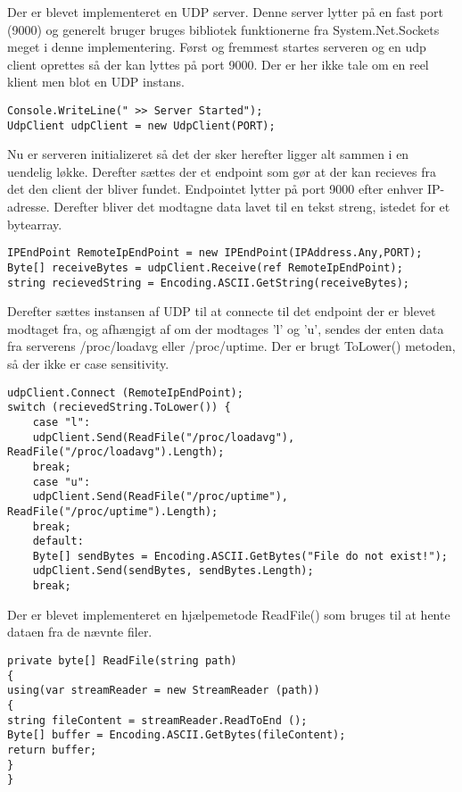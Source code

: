 Der er blevet implementeret en UDP server. Denne server lytter på en fast port (9000) og generelt bruger bruges bibliotek funktionerne fra System.Net.Sockets meget i denne implementering. Først og fremmest startes serveren og en udp client oprettes så der kan lyttes på port 9000. Der er her ikke tale om en reel klient men blot en UDP instans.

\begin{verbatim}
Console.WriteLine(" >> Server Started");
UdpClient udpClient = new UdpClient(PORT);
\end{verbatim}

\noindent Nu er serveren initializeret så det der sker herefter ligger alt sammen i en uendelig løkke. Derefter sættes der et endpoint som gør at der kan recieves fra det den client der bliver fundet. Endpointet lytter på port 9000 efter enhver IP-adresse. Derefter bliver det modtagne data lavet til en tekst streng, istedet for et bytearray.  

\begin{verbatim}
IPEndPoint RemoteIpEndPoint = new IPEndPoint(IPAddress.Any,PORT);
Byte[] receiveBytes = udpClient.Receive(ref RemoteIpEndPoint);
string recievedString = Encoding.ASCII.GetString(receiveBytes);
\end{verbatim}

\noindent Derefter sættes instansen af UDP til at connecte til det endpoint der er blevet modtaget fra, og afhængigt af om der modtages 'l' og 'u', sendes der enten data fra serverens /proc/loadavg eller /proc/uptime. Der er brugt ToLower() metoden, så der ikke er case sensitivity.

\begin{verbatim}
udpClient.Connect (RemoteIpEndPoint);
switch (recievedString.ToLower()) {
	case "l":
	udpClient.Send(ReadFile("/proc/loadavg"), ReadFile("/proc/loadavg").Length);
	break;
	case "u":
	udpClient.Send(ReadFile("/proc/uptime"), ReadFile("/proc/uptime").Length);
	break;
	default:
	Byte[] sendBytes = Encoding.ASCII.GetBytes("File do not exist!");
	udpClient.Send(sendBytes, sendBytes.Length);
	break;
\end{verbatim}

\noindent Der er blevet implementeret en hjælpemetode ReadFile() som bruges til at hente dataen fra de nævnte filer.

\begin{verbatim}
private byte[] ReadFile(string path)
{
using(var streamReader = new StreamReader (path))
{
string fileContent = streamReader.ReadToEnd ();
Byte[] buffer = Encoding.ASCII.GetBytes(fileContent);
return buffer;
}
}
\end{verbatim}

